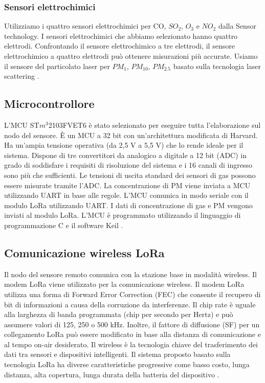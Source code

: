 \documentclass[a4paper]{report} %
\begin{document}
\subsubsection{Sensori elettrochimici}
Utilizziamo i quattro sensori elettrochimici per CO, $ SO_{2} $, $ O_{3} $ e $ NO_{2} $ dalla Sensor technology. I sensori elettrochimici che abbiamo selezionato hanno quattro elettrodi. Confrontando il sensore elettrochimico a tre elettrodi, il sensore elettrochimico a quattro elettrodi può ottenere misurazioni più accurate. Usiamo il sensore del particolato laser per $ PM_{1} $, $ PM_{10} $, $ PM_{2.5} $ basato sulla tecnologia laser scattering \cite{art:rif.40}.

\subsection{Microcontrollore}
L'MCU ST$ m^3 $2103FVET6 è stato selezionato per eseguire tutta l'elaborazione sul nodo del sensore. È un MCU a 32 bit con un'architettura modificata di Harvard. Ha un'ampia tensione operativa (da 2,5 V a 5,5 V) che lo rende ideale per il sistema. Dispone di tre convertitori da analogico a digitale a 12 bit (ADC) in grado di soddisfare i requisiti di risoluzione del sistema e i 16 canali di ingresso sono più che sufficienti. Le tensioni di uscita standard dei sensori di gas possono essere misurate tramite l'ADC. La concentrazione di PM viene inviata a MCU utilizzando UART in base alle regole. L'MCU comunica in modo seriale con il modulo LoRa utilizzando UART. I dati di concentrazione di gas e PM vengono inviati al modulo LoRa. L'MCU è programmato utilizzando il linguaggio di programmazione C e il software Keil \cite{art:rif.40}.

\subsection{Comunicazione wireless LoRa}
Il nodo del sensore remoto comunica con la stazione base in modalità wireless. Il modem LoRa viene utilizzato per la comunicazione wireless. Il modem LoRa utilizza una forma di Forward Error Correction (FEC) che consente il recupero di bit di informazioni a causa della corruzione da interferenze. Il chip rate è uguale alla larghezza di banda programmata (chip per secondo per Hertz) e può assumere valori di 125, 250 o 500 kHz. Inoltre, il fattore di diffusione (SF) per un collegamento LoRa può essere modificato in base alla distanza di comunicazione e al tempo on-air desiderato. Il wireless è la tecnologia chiave del trasferimento dei dati tra sensori e dispositivi intelligenti. Il sistema proposto basato sulla tecnologia LoRa ha diverse caratteristiche progressive come basso costo, lunga distanza, alta copertura, lunga durata della batteria del dispositivo \cite{art:rif.40}.
\end{document}
